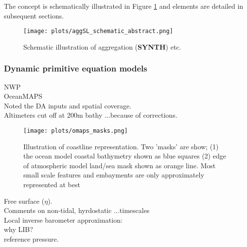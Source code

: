 \documentclass[jmse,article,submit,moreauthors,pdftex,10pt,a4paper]{mdpi}
\begin{document}
The concept is schematically illustrated in Figure \ref{fig:aggSL} and elements are detailed in subsequent sections.  

\begin{figure}[H]
\centering
\texttt{[image: plots/aggSL\_schematic\_abstract.png]}
\caption{Schematic illustration of aggregation (\textbf{SYNTH}) etc. }
\label{fig:aggSL}
\end{figure}   






\subsubsection{Dynamic primitive equation models}

NWP\\
OceanMAPS\\

Noted the DA inputs and spatial coverage.\\
Altimeters cut off at 200m bathy ...because of corrections.



\begin{figure}[H]
    \centering
    \texttt{[image: plots/omaps\_masks.png]}
    \caption{Illustration of coastline representation. Two 'masks' are show; (1) the ocean model coastal bathymetry shown as blue squares (2) edge of atmospheric model land/sea mask shown as orange line.   Most small scale features and embayments are only approximately represented at best }
    \label{fig:map_masks}
\end{figure}  

Free surface ($\eta$).\\
Comments on non-tidal, hyrdostatic ...timescales\\


Local inverse barometer approximation:\\
why LIB?\\
reference pressure.
\end{document}
